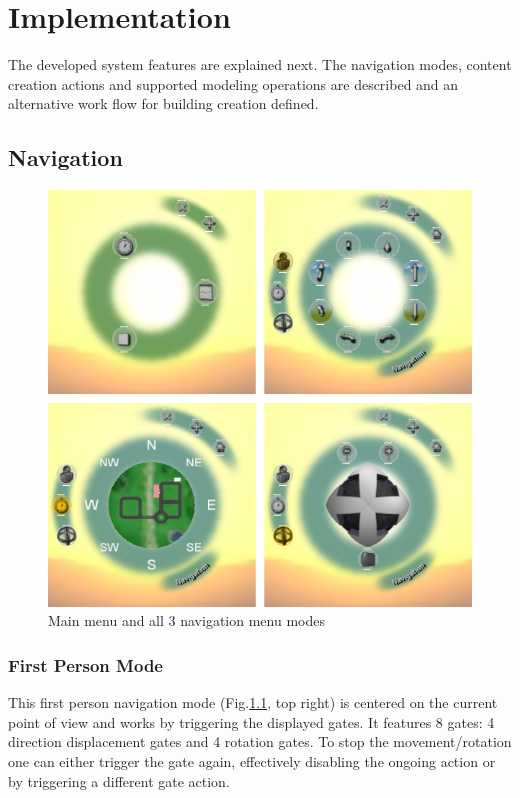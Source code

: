 \chapter{Implementation}


The developed system features are explained next. The navigation modes, content creation actions
and supported modeling operations are described and an alternative work flow for building creation defined.


\section{Navigation}


\begin{figure}[ht]
	\centering
		\includegraphics[scale=0.5]{gfx/main-nav-menus.png}
	\caption{Main menu and all 3 navigation menu modes}
	\label{fig:main-nav-menus}
\end{figure}


\subsection{First Person Mode}

This first person navigation mode (Fig.\ref{fig:main-nav-menus}, top right) is centered on the current point of view and works by triggering the displayed gates.
It features 8 gates: 4 direction displacement gates and 4 rotation gates.
To stop the movement/rotation one can either trigger the gate again, effectively disabling the ongoing action
or by triggering a different gate action.

